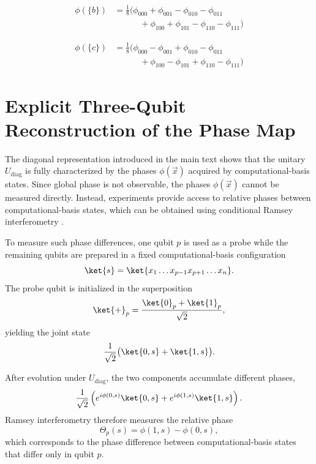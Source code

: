 \begin{equation}
\boxed{
\begin{aligned}
\phi(\{b\})
&= \frac{1}{8}\Big(
\phi_{000}
+\phi_{001}
-\phi_{010}
-\phi_{011} \\
&\qquad\quad
+\phi_{100}
+\phi_{101}
-\phi_{110}
-\phi_{111}
\Big)
\end{aligned}
}
\end{equation}

\begin{equation}
\boxed{
\begin{aligned}
\phi(\{c\})
&= \frac{1}{8}\Big(
\phi_{000}
-\phi_{001}
+\phi_{010}
-\phi_{011} \\
&\qquad\quad
+\phi_{100}
-\phi_{101}
+\phi_{110}
-\phi_{111}
\Big)
\end{aligned}
}
\end{equation}


\section{Explicit Three-Qubit Reconstruction of the Phase Map}
\label{app:explicit_3q_phase_map_reconstruction}

\noindent
The diagonal representation introduced in the main text shows that the unitary $U_{\mathrm{diag}}$ is fully characterized by the phases $\phi(\vec{x})$ acquired by computational-basis states. Since global
phase is not observable, the phases $\phi(\vec{x})$ cannot be measured directly. Instead, experiments provide access to relative phases between computational-basis states, which can be obtained using conditional
Ramsey interferometry \cite{ramsey1950molecular, childress2006coherent, balasubramanian2009ultralong, taminiau2014universal}.

\medskip
\noindent
To measure such phase differences, one qubit $p$ is used as a probe while the remaining qubits are prepared in a fixed computational-basis configuration
\[
\ket{s}=\ket{x_1\dots x_{p-1}x_{p+1}\dots x_n}.
\]
The probe qubit is initialized in the superposition
\[
\ket{+}_p=\frac{\ket{0}_p+\ket{1}_p}{\sqrt2},
\]
yielding the joint state
\[
\frac{1}{\sqrt2}\bigl(\ket{0,s}+\ket{1,s}\bigr).
\]

\medskip
\noindent
After evolution under $U_{\mathrm{diag}}$, the two components accumulate different phases,
\[
\frac{1}{\sqrt2}
\left(
e^{i\phi(0,s)}\ket{0,s}
+
e^{i\phi(1,s)}\ket{1,s}
\right).
\]
Ramsey interferometry therefore measures the relative phase
\begin{equation}
\Theta_p(s)=\phi(1,s)-\phi(0,s),
\label{eq:ramsey_phase}
\end{equation}
which corresponds to the phase difference between computational-basis states that differ only in qubit $p$.


